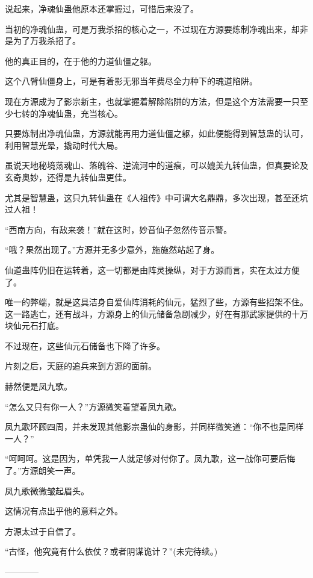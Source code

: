 \begin{this_body}
说起来，净魂仙蛊他原本还掌握过，可惜后来没了。

当初的净魂仙蛊，可是万我杀招的核心之一，不过现在方源要炼制净魂出来，却非是为了万我杀招了。

他的真正目的，在于他的力道仙僵之躯。

这个八臂仙僵身上，可是有着影无邪当年费尽全力种下的魂道陷阱。

现在方源成为了影宗新主，也就掌握着解除陷阱的方法，但是这个方法需要一只至少七转的净魂仙蛊，充当核心。

只要炼制出净魂仙蛊，方源就能再用力道仙僵之躯，如此便能得到智慧蛊的认可，利用智慧光晕，撬动时代大局。

虽说天地秘境荡魂山、落魄谷、逆流河中的道痕，可以媲美九转仙蛊，但真要论及玄奇奥妙，还得是九转仙蛊更佳。

尤其是智慧蛊，这只九转仙蛊在《人祖传》中可谓大名鼎鼎，多次出现，甚至还坑过人祖！

“西南方向，有敌来袭！”就在这时，妙音仙子忽然传音示警。

“哦？果然出现了。”方源并无多少意外，施施然站起了身。

仙道蛊阵仍旧在运转着，这一切都是由阵灵操纵，对于方源而言，实在太过方便了。

唯一的弊端，就是这具洁身自爱仙阵消耗的仙元，猛烈了些，方源有些招架不住。这一路逃亡，还有战斗，方源身上的仙元储备急剧减少，好在有那武家提供的十万块仙元石打底。

不过现在，这些仙元石储备也下降了许多。

片刻之后，天庭的追兵来到方源的面前。

赫然便是凤九歌。

“怎么又只有你一人？”方源微笑着望着凤九歌。

凤九歌环顾四周，并未发现其他影宗蛊仙的身影，并同样微笑道：“你不也是同样一人？”

“呵呵呵。这是因为，单凭我一人就足够对付你了。凤九歌，这一战你可要后悔了。”方源朗笑一声。

凤九歌微微皱起眉头。

这情况有点出乎他的意料之外。

方源太过于自信了。

“古怪，他究竟有什么依仗？或者阴谋诡计？”(未完待续。)

------------

\end{this_body}

